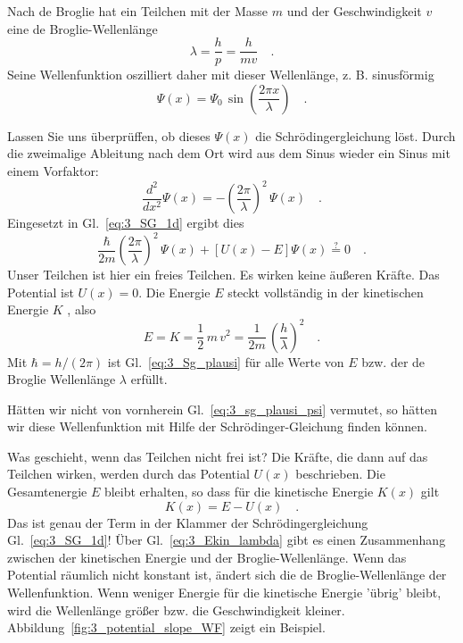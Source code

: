 Nach de Broglie hat ein Teilchen mit der Masse $m$ und der Geschwindigkeit $v$ eine de Broglie-Wellenlänge 
\begin{equation}
    \lambda = \frac{h}{p} = \frac{h}{ m v} \quad .
\end{equation}
Seine Wellenfunktion oszilliert daher mit dieser Wellenlänge, z. B. sinusförmig
\begin{equation}
    \Psi(x) = \Psi_0 \, \sin\left( \frac{2 \pi x}{\lambda} \right) \quad .
    \label{eq:3_sg_plausi_psi}
\end{equation}

Lassen Sie uns überprüffen, ob dieses $\Psi(x)$ die Schrödingergleichung löst.
Durch die zweimalige Ableitung nach dem Ort wird aus dem Sinus wieder ein Sinus mit einem Vorfaktor:
\begin{equation}
    \frac{d^2}{dx^2} \Psi(x)  = - \left(\frac{2 \pi}{\lambda} \right)^2 \, \Psi(x) \quad .
\end{equation}
Eingesetzt in Gl.~\ref{eq:3_SG_1d} ergibt dies
\begin{equation}
     \frac{\hbar}{2m}  \left(\frac{2 \pi}{\lambda} \right)^2 \,  \Psi(x) + \left[ U(x) - E \right] \Psi(x) \overset{?}{=} 0 \quad .
     \label{eq:3_Sg_plausi}
\end{equation}
Unser Teilchen ist hier ein freies Teilchen. Es wirken keine äußeren Kräfte. Das Potential ist $U(x) = 0$. Die Energie $E$ steckt vollständig in der kinetischen Energie $K$ , also 
\begin{equation}
    E =  K = \frac{1}{2} \, m \,  v^2 =  \frac{1}{2m} \, \left( \frac{h}{\lambda} \right)^2 \quad .
    \label{eq:3_Ekin_lambda}
\end{equation}
Mit $\hbar = h / (2 \pi)$ ist Gl.~\ref{eq:3_Sg_plausi} für alle Werte von $E$ bzw. der de Broglie Wellenlänge $\lambda$ erfüllt.

Hätten wir nicht von vornherein  Gl.~\ref{eq:3_sg_plausi_psi} vermutet, so hätten wir diese Wellenfunktion mit Hilfe der Schrödinger-Gleichung finden können.

Was geschieht, wenn das Teilchen nicht frei ist? Die Kräfte, die dann auf das Teilchen wirken, werden durch das Potential $U(x)$ beschrieben. Die Gesamtenergie $E$ bleibt erhalten, so dass für die kinetische Energie $K(x)$ gilt
\begin{equation}
    K(x) = E - U(x) \quad .
\end{equation}
Das ist genau der Term in der Klammer der Schrödingergleichung Gl.~\ref{eq:3_SG_1d}! Über Gl.~\ref{eq:3_Ekin_lambda} gibt es einen Zusammenhang zwischen der kinetischen Energie und der Broglie-Wellenlänge. Wenn das Potential räumlich nicht konstant ist, ändert sich die de Broglie-Wellenlänge der Wellenfunktion. Wenn weniger Energie für die kinetische Energie 'übrig' bleibt, wird die Wellenlänge größer bzw. die Geschwindigkeit kleiner. Abbildung~\ref{fig:3_potential_slope_WF} zeigt ein Beispiel.

